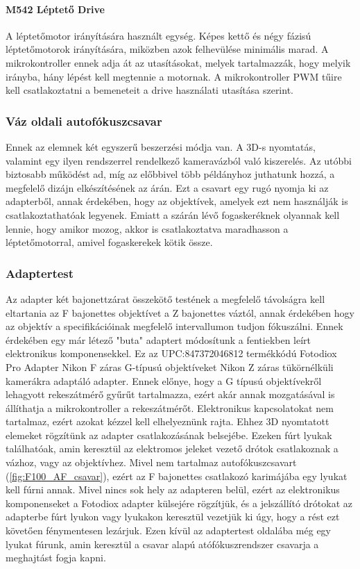 \paragraph{M542 Léptető Drive}\cite{parmar2017design}
A léptetőmotor irányítására használt egység. Képes kettő és négy fázisú léptetőmotorok irányítására, miközben azok felhevülése minimális marad. A mikrokontroller ennek adja át az utasításokat, melyek tartalmazzák, hogy melyik irányba, hány lépést kell megtennie a motornak.\cite{parmar2017design} A mikrokontroller PWM tűire kell csatlakoztatni a bemeneteit a drive használati utasítása szerint\cite{drive}.

\subsubsection{Váz oldali autofókuszcsavar}
Ennek az elemnek két egyszerű beszerzési módja van. A 3D-s nyomtatás, valamint egy ilyen rendszerrel rendelkező kameravázból való kiszerelés. Az utóbbi biztosabb működést ad, míg az előbbivel több példányhoz juthatunk hozzá, a megfelelő dizájn elkészítésének az árán. Ezt  a csavart egy rugó nyomja ki az adapterből, annak érdekében, hogy az objektívek, amelyek ezt nem használják is csatlakoztathatóak legyenek. Emiatt a szárán lévő fogaskeréknek olyannak kell lennie, hogy amikor mozog, akkor is csatlakoztatva maradhasson a léptetőmotorral, amivel fogaskerekek kötik össze.

\subsubsection{Adaptertest}
Az adapter két bajonettzárat összekötő testének a megfelelő távolságra kell eltartania az F bajonettes objektívet a Z bajonettes váztól, annak érdekében hogy az objektív a specifikációinak megfelelő intervallumon tudjon fókuszálni. Ennek érdekében egy már létező "buta" adaptert módosítunk a fentiekben leírt elektronikus komponensekkel. Ez az UPC:847372046812 termékkódú Fotodiox Pro Adapter Nikon F záras G-típusú objektíveket Nikon Z záras tükörnélküli kamerákra adaptáló adapter. Ennek előnye, hogy a G típusú objektívekről lehagyott rekeszátmérő gyűrűt tartalmazza, ezért akár annak mozgatásával is állíthatja a mikrokontroller a rekeszátmérőt. Elektronikus kapcsolatokat nem tartalmaz, ezért azokat kézzel kell elhelyeznünk rajta. Ehhez 3D nyomtatott elemeket rögzítünk az adapter csatlakozásának belsejébe. Ezeken fúrt lyukak találhatóak, amin keresztül az elektromos jeleket vezető drótok csatlakoznak a vázhoz, vagy az objektívhez. Mivel nem tartalmaz autofókuszcsavart (\ref{fig:F100_AF_csavar}), ezért az F bajonettes csatlakozó karimájába egy lyukat kell fúrni annak. Mivel nincs sok hely az adapteren belül, ezért az elektronikus komponenseket a Fotodiox adapter külsejére rögzítjük, és a jelszállító drótokat az adapterbe fúrt lyukon vagy lyukakon keresztül vezetjük ki úgy, hogy a rést ezt követően fénymentesen lezárjuk. Ezen kívül az adaptertest oldalába még egy lyukat fúrunk, amin keresztül a csavar alapú atófókuszrendszer csavarja a meghajtást fogja kapni.

